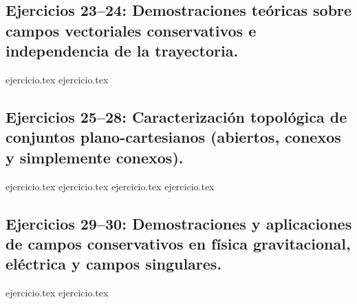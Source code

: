 \subsection*{Ejercicios 23--24: Demostraciones teóricas sobre campos vectoriales conservativos e independencia de la trayectoria.}
\begin{enumerate}
    \setcounter{enumi}{22}
    {ejercicio.tex}
    {ejercicio.tex}
\end{enumerate}

\subsection*{Ejercicios 25--28: Caracterización topológica de conjuntos plano-cartesianos (abiertos, conexos y simplemente conexos).}
\begin{enumerate}
    \setcounter{enumi}{24}
    {ejercicio.tex}
    {ejercicio.tex}
    {ejercicio.tex}
    {ejercicio.tex}
\end{enumerate}

\subsection*{Ejercicios 29--30: Demostraciones y aplicaciones de campos conservativos en física gravitacional, eléctrica y campos singulares.}
\begin{enumerate}
    \setcounter{enumi}{28}
    {ejercicio.tex}
    {ejercicio.tex}
\end{enumerate}
